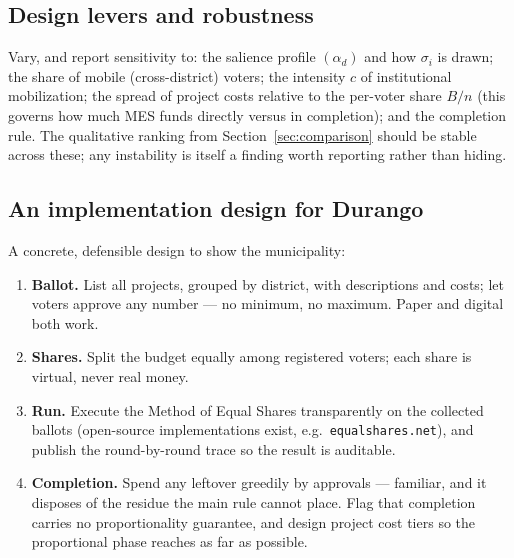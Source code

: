 \documentclass[11pt,letterpaper]{article}
\theoremstyle{definition}
\theoremstyle{plain}
\theoremstyle{remark}
\newcommand{\budget}{B}
\newcommand{\salience}{\alpha}
\begin{document}
\subsection{Design levers and robustness}

Vary, and report sensitivity to: the salience profile $(\salience_d)$ and how $\sigma_i$ is drawn;
the share of mobile (cross-district) voters; the intensity $c$ of institutional mobilization; the
spread of project costs relative to the per-voter share $\budget/n$ (this governs how much MES funds
directly versus in completion); and the completion rule. The qualitative ranking from
Section~\ref{sec:comparison} should be stable across these; any instability is itself a finding worth
reporting rather than hiding.

\subsection{An implementation design for Durango}

A concrete, defensible design to show the municipality:
\begin{enumerate}[label=\textbf{\arabic*.},nosep]
  \item \textbf{Ballot.} List all projects, grouped by district, with descriptions and costs; let
        voters approve any number --- no minimum, no maximum. Paper and digital both work.
  \item \textbf{Shares.} Split the budget equally among registered voters; each share is virtual,
        never real money.
  \item \textbf{Run.} Execute the Method of Equal Shares transparently on the collected ballots
        (open-source implementations exist, e.g.\ \texttt{equalshares.net}), and publish the
        round-by-round trace so the result is auditable.
  \item \textbf{Completion.} Spend any leftover greedily by approvals --- familiar, and it disposes of
        the residue the main rule cannot place. Flag that completion carries no proportionality
        guarantee, and design project cost tiers so the proportional phase reaches as far as
        possible.
\end{enumerate}
\end{document}
